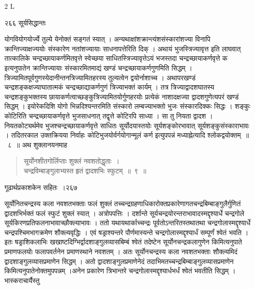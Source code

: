 \documentclass[11pt, openany]{book}
\begin{document}
{\tiny{2 L}}

\newpage

\noindent २६६ \hspace{4cm} सूर्यसिद्धान्तः
\vspace{1cm}


\noindent योगवियोगयोर्ज्ये तुल्ये येनोक्तं सङ्गतं स्यात् । अन्यथाक्षांशक्रान्त्यंशसंस्कारांशज्या विनापि क्रान्तिज्याक्षज्ययोः संस्कारेण नतांशज्यायाः साधनापत्तेरिति दिक् । अथायं भुजस्त्रिज्यावृत्त इति लाघवात् तात्कालिके चन्द्रच्छायाकर्णमितवृत्ते स्वेच्छया साधितस्त्रिज्यावृत्तेऽयं भजस्तदा चन्द्रच्छायाकर्णवृत्ते क इत्यनुपातेन क्रान्तिज्यायाः संस्कारमितमाद्यं खण्डं चन्द्रच्छायाकर्णगुणमिति सिद्धम् । त्रिज्यामितपूर्वगुणस्येदानीन्तनत्रिज्यामितहरस्य तुल्यत्वेन द्वयोर्नाशाच्च । अथापरखण्डं चन्द्रशङ्कक्षज्याघातात्मकं चन्द्रच्छाद्याकर्णगुणं त्रिज्याभक्तं कार्यम् । तत्र त्रिज्याद्वादशघातस्य चन्द्रशङ्कुभक्तस्य छायाकर्णत्वाच्छङ्कुत्रिज्यामितयोर्गुणहरयोः प्रत्येकं नाशादक्षज्या द्वादशगुणेत्यपरं खण्डं सिद्धम् । इयोरेकदिशि योगो भिन्नदिश्यन्तरमिति संस्कारो लम्बज्याभक्तो भुजः संस्कारदिक्कः सिद्धः । शङ्कुः कोटिरिति चन्द्रच्छायाकर्णवृत्ते भुजसाधनात् तद्वृत्ते कोटिरपि साध्या । सा तु नियता द्वादश । नियतकोट्यर्थमेव भुजश्चन्द्रच्छायाकर्णवृत्ते साधितः सूर्योदयास्तयोः सूर्यशङ्कोरभावात् सूर्यशङ्कुसंस्काराभावः । तदितरकाल उक्तक्रियया निर्वाहः कोटिभुजयोर्वर्गयोगान्मूलं कर्ण इत्युपपन्नं मध्याह्नेत्यादि श्लोकद्वयोक्तम्~॥~८~॥
\noindent अथ शुक्लानयनमाह \textendash 


\begin{quote}
{\ssi सूर्योनशीतगोर्लिप्ताः शुक्लं नवशतोद्धृताः~।\\
 चन्द्रविम्बाङ्गुलाभ्यस्त हृतं द्वादशभिः स्फुटम्~॥~९~॥}
\end{quote}

\newpage



 \hspace{3cm} गूढार्थप्रकाशकेन सहितः~।\hfill २६७
\vspace{1cm}



 सूर्योनितचन्द्रस्य कला नवशतभक्ताः फलं शुक्लं तच्चन्द्रग्रहणाधिकारोक्तप्रकारेणागतचन्द्रबिम्बाङ्गुलैर्गुणितं द्वादशभिर्भक्तं फलं स्फुटं शुक्लं स्यात् । अत्रोपपत्तिः । दर्शान्ते सूर्यचन्द्रयोरन्तराभावादस्मद्दृश्यार्धे चन्द्रगोले सूर्यकिरणप्रतिफलनाभावाच्छौक्ल्याभावः । ततो यथायथार्काच्चन्द्रः पूर्वतोऽन्तरितस्तथातथा चन्द्रगोलास्मद्दृश्यार्धे चन्द्रपश्चिमभागक्रमेण शौक्ल्यवृद्धिः । एवं षड्राश्यन्तरे पौर्णमास्यन्ते चन्द्रगोलास्मद्दृश्यार्धं सम्पूर्णं श्वेतं भवति । इतः षड्राशिकलाभिः खखाष्टदिग्भिर्द्वादशाङ्गुलव्यासबिम्बं श्वेतं तदेष्टेन सूर्योनचन्द्रकलागुणेन किमित्यनुपाते प्रमाणफलयोः फलापवर्तनेन प्रमाणस्थाने नवशतम् । अतः सूर्योनचन्द्रस्य कला नवशतभक्ताः शौक्ल्यमिदं द्वादशाङ्गुलव्यासप्रमाणेन सिद्धम् । अतो द्वादशाङ्गुलप्रमाणेनेदं तदाभिमतच्चन्द्रबिम्बाङ्गुलव्यासप्रमाणेन किमित्यनुपातेनोक्तमुपपन्नम् ।अनेन प्रकारेण त्रिभान्तरे चन्द्रगोलास्मद्दृश्यार्धभर्धं श्वेतं भवतीति सिद्धम् । भास्कराचार्यैस्तु\textendash
\end{document}
